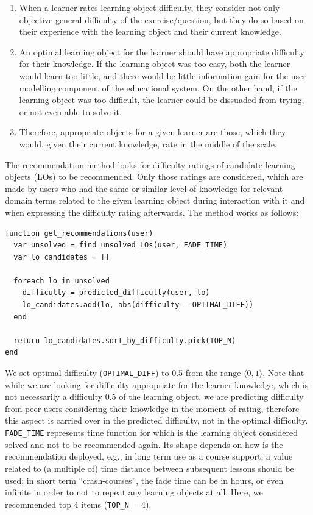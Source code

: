 \documentclass{llncs}
\begin{document}
\begin{enumerate}
\item When a learner rates learning object difficulty, they consider not only objective general difficulty of the exercise/question, but they do so based on their experience with the learning object and their current knowledge.
\item An optimal learning object for the learner should have appropriate difficulty for their knowledge. If the learning object was too easy, both the learner would learn too little, and there would be little information gain for the user modelling component of the educational system. On the other hand, if the learning object was too difficult, the learner could be dissuaded from trying, or not even able to solve it.
\item Therefore, appropriate objects for a given learner are those, which they would, given their current knowledge, rate in the middle of the scale.
\end{enumerate}

The recommendation method looks for difficulty ratings of candidate learning objects (LOs) to be recommended. Only those ratings are considered, which are made by users who had the same or similar level of knowledge for relevant domain terms related to the given learning object during interaction with it and when expressing the difficulty rating afterwards. The method works as follows:

\begin{verbatim}
function get_recommendations(user)
  var unsolved = find_unsolved_LOs(user, FADE_TIME)
  var lo_candidates = []

  foreach lo in unsolved
    difficulty = predicted_difficulty(user, lo)
    lo_candidates.add(lo, abs(difficulty - OPTIMAL_DIFF))
  end

  return lo_candidates.sort_by_difficulty.pick(TOP_N)
end
\end{verbatim}

We set optimal difficulty (\verb|OPTIMAL_DIFF|) to 0.5 from the range $\langle 0,1 \rangle$. Note that while we are looking for difficulty appropriate for the learner knowledge, which is not necessarily a difficulty 0.5 of the learning object, we are predicting difficulty from peer users considering their knowledge in the moment of rating, therefore this aspect is carried over in the predicted difficulty, not in the optimal difficulty. \verb|FADE_TIME| represents time function for which is the learning object considered solved and not to be recommended again. Its shape depends on how is the recommendation deployed, e.g., in long term use as a course support, a value related to (a multiple of) time distance between subsequent lessons should be used; in short term ``crash-courses'', the fade time can be in hours, or even infinite in order to not to repeat any learning objects at all. Here, we recommended top 4 items (\verb|TOP_N| = 4).
\end{document}
